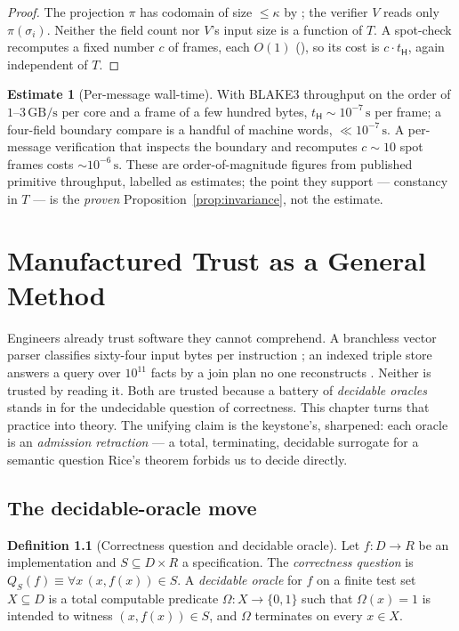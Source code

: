 \documentclass[11pt,oneside]{book}
\theoremstyle{definition}
\newtheorem{definition}{Definition}[chapter]
\newtheorem{estimate}{Estimate}[chapter]
\theoremstyle{plain}
\theoremstyle{remark}
\newcommand{\Proj}{\pi}                        %
\newcommand{\chainH}{\mathsf{H}}               %
\newcommand{\CL}{\kappa}                       %
\begin{document}
\begin{proof}
The projection $\Proj$ has codomain of size $\le\CL$ by \cite[Def.~3.1]{keystone}; the verifier
$V$ reads only $\Proj(\sigma_i)$. Neither the field count nor $V$'s input size is a function of
$T$. A spot-check recomputes a fixed number $c$ of frames, each $O(1)$
(\cite[Def.~4.1]{keystone}), so its cost is $c\cdot t_{\chainH}$, again independent of $T$.
\end{proof}

\begin{estimate}[Per-message wall-time]\label{est:wall}
With BLAKE3 throughput on the order of $1$--$3\,\mathrm{GB/s}$ per core \cite{blake3} and a frame
of a few hundred bytes, $t_{\chainH}\sim 10^{-7}\,\mathrm{s}$ per frame; a four-field boundary
compare is a handful of machine words, $\ll 10^{-7}\,\mathrm{s}$. A per-message verification that
inspects the boundary and recomputes $c\!\sim\!10$ spot frames costs $\sim 10^{-6}\,\mathrm{s}$.
These are order-of-magnitude figures from published primitive throughput, labelled as estimates;
the point they support --- constancy in $T$ --- is the \emph{proven}
Proposition~\ref{prop:invariance}, not the estimate.
\end{estimate}

\chapter{Manufactured Trust as a General Method}
\label{ch:mt}

Engineers already trust software they cannot comprehend. A branchless vector parser classifies
sixty-four input bytes per instruction \cite{simdjson}; an indexed triple store answers a query
over $10^{11}$ facts by a join plan no one reconstructs \cite{qlever}. Neither is trusted by
reading it. Both are trusted because a battery of \emph{decidable oracles} stands in for the
undecidable question of correctness. This chapter turns that practice into theory. The unifying
claim is the keystone's, sharpened: each oracle is an \emph{admission retraction} --- a total,
terminating, decidable surrogate for a semantic question Rice's theorem forbids us to decide
directly.

\section{The decidable-oracle move}

\begin{definition}[Correctness question and decidable oracle]\label{def:oracle}
Let $f:D\to R$ be an implementation and $S\subseteq D\times R$ a specification. The
\emph{correctness question} is $Q_S(f)\equiv\forall x\,(x,f(x))\in S$. A \emph{decidable oracle}
for $f$ on a finite test set $X\subseteq D$ is a total computable predicate $\Omega:X\to\{0,1\}$
such that $\Omega(x)=1$ is intended to witness $(x,f(x))\in S$, and $\Omega$ terminates on every
$x\in X$.
\end{definition}
\end{document}
